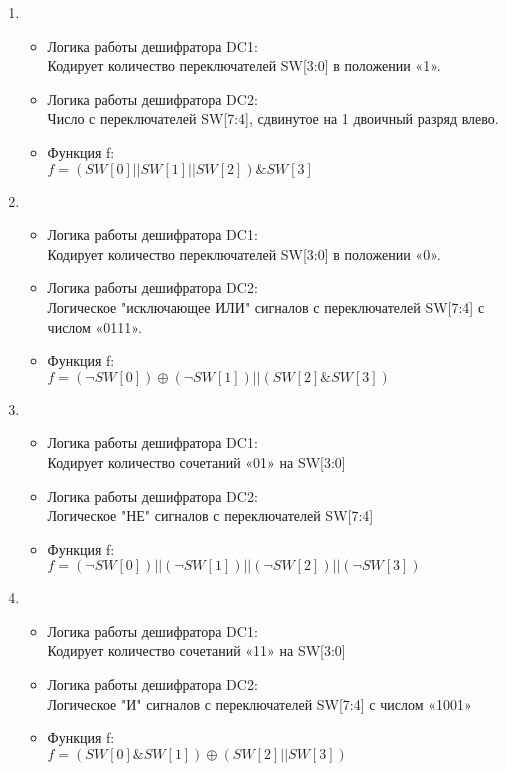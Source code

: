 \begin{enumerate}
    \item{
    \begin{itemize}
    \item Логика работы дешифратора DC1: \\
      Кодирует количество переключателей SW[3:0] в положении «1».
    \item Логика работы дешифратора DC2: \\ 
      Число с переключателей SW[7:4], сдвинутое на 1 двоичный разряд влево.
    \item Функция f:\\
      $f = (SW[0] || SW[1] || SW[2]) \& SW[3]$
    \end{itemize}
  }

    \item{
    \begin{itemize}
    \item Логика работы дешифратора DC1: \\
      Кодирует количество переключателей SW[3:0] в положении «0».
    \item Логика работы дешифратора DC2: \\ 
      Логическое "исключающее ИЛИ" сигналов с переключателей SW[7:4] с числом «0111».
    \item Функция f:\\
      $f = (\neg SW[0]) \oplus (\neg SW[1]) || (SW[2] \& SW[3])$
    \end{itemize}
  }

    \item{
    \begin{itemize}
    \item Логика работы дешифратора DC1: \\
      Кодирует количество сочетаний «01» на SW[3:0]
    \item Логика работы дешифратора DC2: \\ 
      Логическое "НЕ" сигналов с переключателей SW[7:4]
    \item Функция f:\\
      $f = (\neg SW[0]) || (\neg SW[1]) || (\neg SW[2]) || (\neg SW[3])$
    \end{itemize}
  }

    \item{
    \begin{itemize}
    \item Логика работы дешифратора DC1: \\
      Кодирует количество сочетаний «11» на SW[3:0]
    \item Логика работы дешифратора DC2: \\ 
      Логическое "И" сигналов с переключателей SW[7:4] с числом «1001»
    \item Функция f:\\
      $f = (SW[0] \& SW[1]) \oplus (SW[2] || SW[3])$
    \end{itemize}
  }


\end{enumerate}

